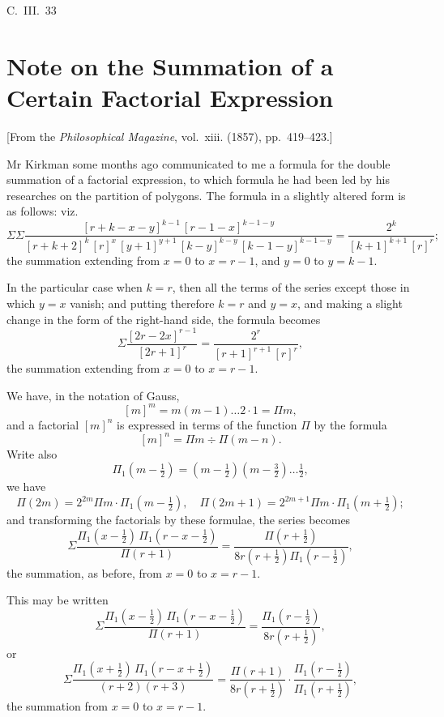 \documentclass[11pt,a4paper]{book}
\begin{document}
{{\hfill C.~III.~33
\newpage


\section{Note on the Summation of a Certain Factorial Expression}
\label{sec:205}

[From the \textit{Philosophical Magazine}, vol.~xiii. (1857), pp.~419--423.]
\vspace{1em}

Mr Kirkman some months ago communicated to me a formula for the double summation of a factorial expression, to which formula he had been led by his researches on the partition of polygons. The formula in a slightly altered form is as follows: viz.
\[
\Sigma\Sigma \frac{[r+k-x-y]^{k-1}\,[r-1-x]^{k-1-y}}{[r+k+2]^{k}\,[r]^{x}\,[y+1]^{y+1}\,[k-y]^{k-y}\,[k-1-y]^{k-1-y}} = \frac{2^k}{[k+1]^{k+1}\,[r]^{r}};
\]
the summation extending from $x=0$ to $x=r-1$, and $y=0$ to $y=k-1$.

In the particular case when $k=r$, then all the terms of the series except those in which $y=x$ vanish; and putting therefore $k=r$ and $y=x$, and making a slight change in the form of the right-hand side, the formula becomes
\[
\Sigma \frac{[2r-2x]^{r-1}}{[2r+1]^{r}} = \frac{2^r}{[r+1]^{r+1}\,[r]^{r}},
\]
the summation extending from $x=0$ to $x=r-1$.

We have, in the notation of Gauss,
\[
[m]^m = m(m-1)\ldots 2 \cdot 1 = \Pi m,
\]
and a factorial $[m]^n$ is expressed in terms of the function $\Pi$ by the formula
\[
[m]^n = \Pi m \div \Pi(m-n).
\]
Write also
\[
\Pi_1(m - \tfrac{1}{2}) = (m - \tfrac{1}{2})(m - \tfrac{3}{2})\ldots \tfrac{1}{2},
\]
we have
\[
\Pi(2m) = 2^{2m} \Pi m \cdot \Pi_1(m - \tfrac{1}{2}), \quad \Pi(2m+1) = 2^{2m+1} \Pi m \cdot \Pi_1(m + \tfrac{1}{2});
\]
and transforming the factorials by these formulae, the series becomes
\[
\Sigma \frac{\Pi_1(x - \tfrac{1}{2})\,\Pi_1(r - x - \tfrac{1}{2})}{\Pi(r+1)} = \frac{\Pi(r + \tfrac{1}{2})}{8r(r + \tfrac{1}{2})\Pi_1(r - \tfrac{1}{2})},
\]
the summation, as before, from $x=0$ to $x=r-1$.

This may be written
\[
\Sigma \frac{\Pi_1(x - \tfrac{1}{2})\,\Pi_1(r - x - \tfrac{1}{2})}{\Pi(r+1)} = \frac{\Pi_1(r - \tfrac{1}{2})}{8r(r + \tfrac{1}{2})},
\]
or
\[
\Sigma \frac{\Pi_1(x + \tfrac{1}{2})\,\Pi_1(r - x + \tfrac{1}{2})}{(r+2)(r+3)} = \frac{\Pi(r+1)}{8r(r+\tfrac{1}{2})} \cdot \frac{\Pi_1(r - \tfrac{1}{2})}{\Pi_1(r + \tfrac{1}{2})},
\]
the summation from $x=0$ to $x=r-1$.

}}
\end{document}
